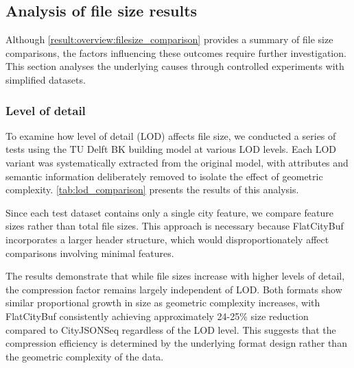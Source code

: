 \subsection{Analysis of file size results}
\label{result:overview:analysis_of_file_size_results}
Although \autoref{result:overview:filesize_comparison} provides a summary of file size comparisons, the factors influencing these outcomes require further investigation. This section analyses the underlying causes through controlled experiments with simplified datasets.

\subsubsection{Level of detail}
\label{result:overview:analysis_of_file_size_results:level_of_detail}

To examine how level of detail (LOD) affects file size, we conducted a series of tests using the TU Delft BK building model at various LOD levels. Each LOD variant was systematically extracted from the original model, with attributes and semantic information deliberately removed to isolate the effect of geometric complexity. \autoref{tab:lod_comparison} presents the results of this analysis.

Since each test dataset contains only a single city feature, we compare feature sizes rather than total file sizes. This approach is necessary because FlatCityBuf incorporates a larger header structure, which would disproportionately affect comparisons involving minimal features.

The results demonstrate that while file sizes increase with higher levels of detail, the compression factor remains largely independent of LOD. Both formats show similar proportional growth in size as geometric complexity increases, with FlatCityBuf consistently achieving approximately 24-25\% size reduction compared to CityJSONSeq regardless of the LOD level. This suggests that the compression efficiency is determined by the underlying format design rather than the geometric complexity of the data.

